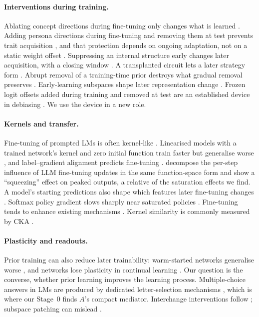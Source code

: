 \documentclass[11pt]{article}
\begin{document}
\paragraph{Interventions during training.} Ablating concept directions during fine-tuning only changes what is learned \citep{casademunt2025}. Adding persona directions during fine-tuning and removing them at test prevents trait acquisition \citep{chen2025persona}, and that protection depends on ongoing adaptation, not on a static weight offset \citep{guan2026}. Suppressing an internal structure early changes later acquisition, with a closing window \citep{chen2024sudden}. A transplanted circuit lets a later strategy form \citep{singh2025coopetition}. Abrupt removal of a training-time prior destroys what gradual removal preserves \citep{yang2026}. Early-learning subspaces shape later representation change \citep{deng2026}. Frozen logit offsets added during training and removed at test are an established device in debiasing \citep{clark2019}. We use the device in a new role.

\paragraph{Kernels and transfer.} Fine-tuning of prompted LMs is often kernel-like \citep{malladi2023}. Linearised models with a trained network's kernel and zero initial function train faster but generalise worse \citep{ortizjimenez2021}, and label--gradient alignment predicts fine-tuning \citep{deshpande2021}. \citet{ren2025} decompose the per-step influence of LLM fine-tuning updates in the same function-space form and show a ``squeezing'' effect on peaked outputs, a relative of the saturation effects we find. A model's starting predictions also shape which features later fine-tuning changes \citep{kumar2022}. Softmax policy gradient slows sharply near saturated policies \citep{mei2020}. Fine-tuning tends to enhance existing mechanisms \citep{prakash2024}. Kernel similarity is commonly measured by CKA \citep{kornblith2019}.

\paragraph{Plasticity and readouts.} Prior training can also reduce later trainability: warm-started networks generalise worse \citep{ash2020}, and networks lose plasticity in continual learning \citep{lyle2023,dohare2024}. Our question is the converse, whether prior learning improves the learning process. Multiple-choice answers in LMs are produced by dedicated letter-selection mechanisms \citep{lieberum2023,wiegreffe2025}, which is where our Stage~0 finds $A$'s compact mediator. Interchange interventions follow \citet{geiger2024das}; subspace patching can mislead \citep{makelov2024}.
\end{document}
